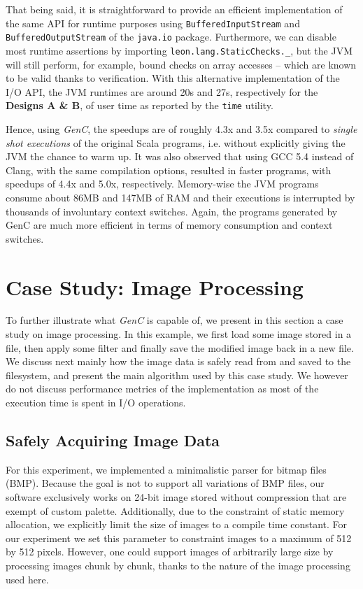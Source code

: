 \documentclass[a4paper,twoside]{article}
\newcommand{\Inline}[1]{\lstinline[basicstyle=\ttfamily]|#1|}
\newcommand{\InlineS}[1]{\lstinline[language=Leon]|#1|}
\let\oldsection\section
\renewcommand\section{\cleardoublepage\oldsection}
\newcommand{\GenC}{\emph{GenC}\xspace}
\begin{document}
That being said, it is straightforward to provide an efficient implementation of
the same API for runtime purposes using \InlineS{BufferedInputStream} and
\InlineS{BufferedOutputStream} of the \InlineS{java.io} package. Furthermore, we
can disable most runtime assertions by importing
\InlineS{leon.lang.StaticChecks._}, but the JVM will still perform, for example,
bound checks on array accesses -- which are known to be valid thanks to
verification. With this alternative implementation of the I/O API, the JVM
runtimes are around 20s and 27s, respectively for the \textbf{Designs A \& B},
of user time as reported by the \Inline{time} utility.

Hence, using \GenC, the speedups are of roughly 4.3x and 3.5x compared to
\emph{single shot executions} of the original Scala programs, i.e. without
explicitly giving the JVM the chance to warm up. It was also observed that using
GCC 5.4 instead of Clang, with the same compilation options, resulted in faster
programs, with speedups of 4.4x and 5.0x, respectively. Memory-wise the JVM
programs consume about 86MB and 147MB of RAM and their executions is interrupted
by thousands of involuntary context switches.  Again, the programs generated by
GenC are much more efficient in terms of memory consumption and context
switches.


\section{Case Study: Image Processing}
\label{img_proc}

To further illustrate what \GenC is capable of, we present in this section a
case study on image processing. In this example, we first load some image stored
in a file, then apply some filter and finally save the modified image back in a
new file. We discuss next mainly how the image data is safely read from and
saved to the filesystem, and present the main algorithm used by this case study.
We however do not discuss performance metrics of the implementation as most of
the execution time is spent in I/O operations.

\subsection{Safely Acquiring Image Data}

For this experiment, we implemented a minimalistic parser for bitmap files
(BMP). Because the goal is not to support all variations of BMP files, our
software exclusively works on 24-bit image stored without compression that are
exempt of custom palette. Additionally, due to the constraint of static memory
allocation, we explicitly limit the size of images to a compile time constant.
For our experiment we set this parameter to constraint images to a maximum of
512 by 512 pixels. However, one could support images of arbitrarily large size
by processing images chunk by chunk, thanks to the nature of the image
processing used here.
\end{document}
